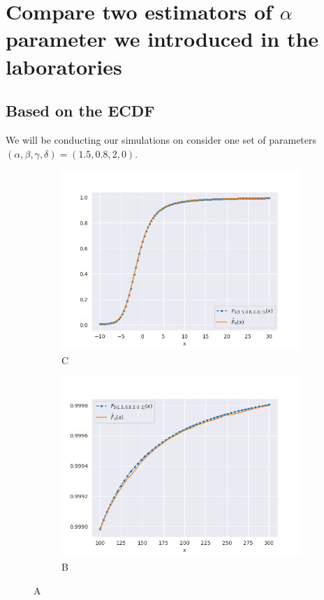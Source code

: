 \documentclass{article}
\begin{document}
		\section{Compare two estimators of $\alpha$ parameter we introduced in the laboratories}
		\subsection{Based on the ECDF}
		We will be conducting our simulations on consider one set of parameters $(\alpha, \beta , \gamma, \delta) = (1.5, 0.8, 2, 0)$.

		\begin{figure}
			\begin{subfigure}{.5\textwidth}
				\centering
				\includegraphics[width=1\linewidth]{images/stable_CDF.png}
				\caption{C}
			\end{subfigure}
			\begin{subfigure}[r]{.5\textwidth}
				\centering
				\includegraphics[width=1\linewidth]{images/stable_CDF_large_x.png}
				\caption{B}
			\end{subfigure}
			\caption{A}
		\end{figure}
\end{document}
